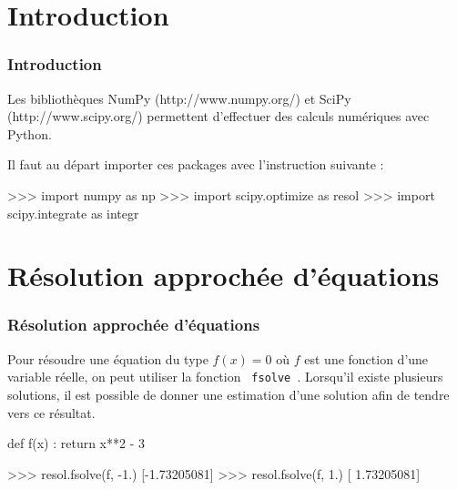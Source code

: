 

\section{Introduction} 

\begin{frame}[fragile]
\frametitle{Introduction}

Les bibliothèques NumPy (http://www.numpy.org/) et SciPy (http://www.scipy.org/) permettent d'effectuer des calculs numériques avec Python.

Il faut au départ importer ces packages avec l'instruction suivante :

\begin{GrayBox}[0.85\textwidth]
\begin{verbatimtab}[3]
>>> import numpy as np
>>> import scipy.optimize as resol
>>> import scipy.integrate as integr
\end{verbatimtab}
\end{GrayBox}

\end{frame}

\section{Résolution approchée d'équations} 

\begin{frame}[fragile]
\frametitle{Résolution approchée d'équations}

Pour résoudre une équation du type $f(x) = 0$ où $f$ est une fonction d'une variable réelle, on peut utiliser la fonction \verb? fsolve ?. Lorsqu'il existe plusieurs solutions, il est possible de donner une estimation d'une solution afin de tendre vers ce résultat.

\begin{GrayBox}[0.85\textwidth]
\begin{verbatimtab}[3]
def f(x) :
	return x**2 - 3
	
>>> resol.fsolve(f, -1.)
[-1.73205081]
>>> resol.fsolve(f, 1.)
[ 1.73205081]
\end{verbatimtab}
\end{GrayBox}

\end{frame}

